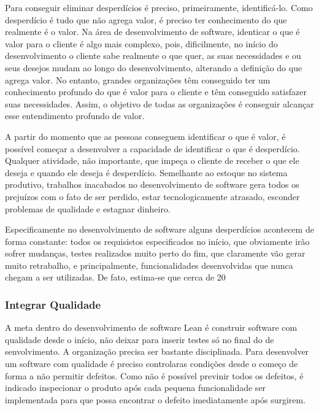 Para conseguir eliminar desperdícios é preciso, primeiramente, identificá-lo. Como desperdício é tudo que não agrega valor, é preciso ter conhecimento do que realmente é o valor. Na área de desenvolvimento de software, identicar o que é valor para o cliente é algo mais complexo, pois, dificilmente, no início do desenvolvimento o cliente sabe realmente o que quer, as suas necessidades e ou seus desejos mudam ao longo do desenvolvimento, alterando a definição do que agrega valor. No entanto, grandes organizações têm conseguido ter um conhecimento profundo do que é valor para o cliente e têm conseguido satisfazer suas necessidades. Assim, o objetivo de todas as organizações é conseguir alcançar esse entendimento profundo de valor.

A partir do momento que as pessoas conseguem identificar o que é valor, é possível começar a desenvolver a capacidade de identificar o que é desperdício. Qualquer atividade, não importante, que impeça o cliente de receber o que ele deseja e quando ele deseja é desperdício. Semelhante ao estoque no sistema produtivo, trabalhos inacabados no desenvolvimento de software gera todos os prejuízos com o fato de ser perdido, estar tecnologicamente atrasado, esconder problemas de qualidade e estagnar dinheiro.

Especificamente no desenvolvimento de software alguns desperdícios acontecem de forma constante: todos os requisistos especificados no início, que obviamente irão sofrer mudanças, testes realizados muito perto do fim, que claramente vão gerar muito retrabalho, e principalmente, funcionalidades desenvolvidas que nunca chegam a ser utilizadas.  De fato, estima-se que cerca de 20%

\subsubsection[Integrar Qualidade]{Integrar Qualidade}

A meta dentro do desenvolvimento de software Lean é construir software com qualidade desde o início, não deixar para inserir testes só no final do de senvolvimento. A organização precisa ser bastante disciplinada. Para desenvolver um software com qualidade é preciso controlaras condições desde o começo de forma a não permitir defeitos. Como não é possível previnir todos os defeitos, é indicado inspecionar o produto após cada pequena funcionalidade ser implementada para que possa encontrar o defeito imediatamente após surgirem.

